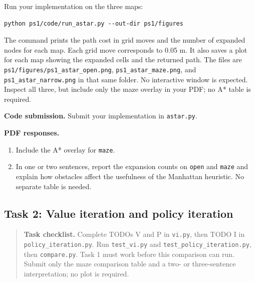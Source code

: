 \documentclass[11pt]{article}
\newenvironment{studentanswer}[1]
  {\par\medskip\noindent
   \begin{tcolorbox}[height from=#1 to 100cm, colback=white, colframe=gray!60,
     boxrule=0.6pt, arc=0pt, outer arc=0pt, left=7pt, right=7pt,
     top=7pt, bottom=7pt, title={Answer / work}, fonttitle=\small,
     coltitle=black, colbacktitle=gray!8, titlerule=0pt]
   \ignorespaces}
  {\end{tcolorbox}\par}
\begin{document}
Run your implementation on the three maps:
\begin{lstlisting}
python ps1/code/run_astar.py --out-dir ps1/figures
\end{lstlisting}
The command prints the path cost in grid moves and the number of
expanded nodes for each map. Each grid move corresponds to 0.05 m.
It also saves a plot for each map showing the expanded cells and the
returned path. The files are \texttt{ps1/figures/ps1\_astar\_open.png},
\texttt{ps1\_astar\_maze.png}, and \texttt{ps1\_astar\_narrow.png}
in that same folder. No interactive window is expected. Inspect all
three, but include only the maze overlay in your PDF; no A* table is required.

\textbf{Code submission.} Submit your implementation in \texttt{astar.py}.

\clearpage
{}
\textbf{PDF responses.}
\begin{enumerate}[label=(\alph*)]

\Needspace{9.5cm}
\item Include the A* overlay for \texttt{maze}.

\begin{studentanswer}{8cm}
\end{studentanswer}

\Needspace{4.5cm}
\item In one or two sentences, report the expansion counts on \texttt{open} and \texttt{maze} and explain how obstacles affect the usefulness of the Manhattan heuristic. No separate table is needed.

\begin{studentanswer}{3cm}
\end{studentanswer}

\end{enumerate}
\clearpage
\subsection{Task 2: Value iteration and policy iteration}

\begin{quote}\small
\textbf{Task checklist.} Complete TODOs V and P in \texttt{vi.py}, then
TODO I in \texttt{policy\_iteration.py}. Run \texttt{test\_vi.py} and
\texttt{test\_policy\_iteration.py}, then \texttt{compare.py}.
Task 1 must work before this comparison can run. Submit only the maze
comparison table and a two- or three-sentence interpretation; no plot is required.
\end{quote}
\end{document}
